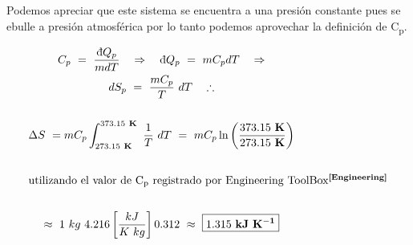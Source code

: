 
Podemos apreciar que este sistema se encuentra a una presión constante
pues se ebulle a presión atmosférica por lo tanto podemos aprovechar 
la definición de C\textsubscript{p}.

\begin{gather*}
    C_{p}\ =\ \frac{\dbar Q_{p}}{mdT}\ \ \ \Rightarrow\ \ \
    \dbar Q_{p}\ =\ mC_{p}dT\ \ \ \Rightarrow\\
    dS_{p}\ =\ \frac{mC_{p}}{T}\ dT\ \ \ \therefore\\
    \\
    \Delta S\ = mC_{p} \int_{273.15\ \um{K}}^{373.15\ \um{K}}\ \frac{1}{T}\ dT\ =\
    mC_{p} \ln{\left(\frac{373.15\ \um{K}}{273.15\ \um{K}}\right)}\\ 
    \\
    \shortintertext{utilizando el valor de C\textsubscript{p} registrado por Engineering ToolBox\cita{Engineering}}\\
    \approx \ 1\ kg\ 4.216 \left[\frac{kJ}{K\ kg}\right] 0.312\ \approx\ \boxed{1.315\ \um{kJ\ K^{-1}}}
\end{gather*}